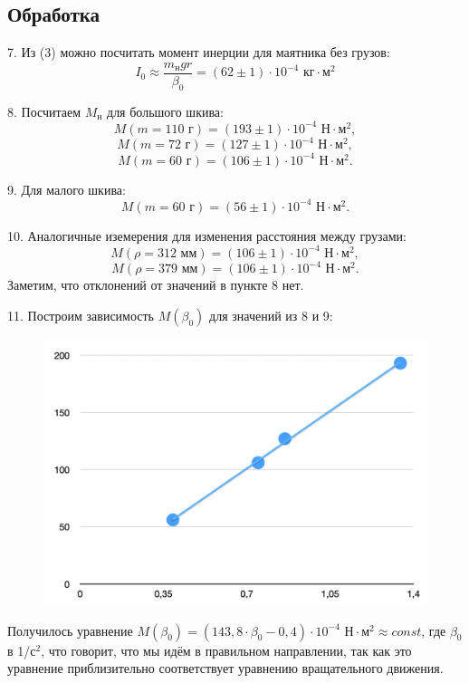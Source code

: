 \subsection{Обработка}

7. Из (3) можно посчитать момент инерции для маятника без грузов:
\begin{equation*}
    I_0 \approx \frac{m_\text{н}gr}{\beta_0} = (62 \pm 1)\cdot 10^{-4} \text{ кг} \cdot \text{м}^2
\end{equation*}

8. Посчитаем $M_\text{н}$ для большого шкива:
\[M (m = 110\text{ г})  = (193 \pm 1) \cdot 10^{-4} \text{ Н} \cdot \text{м}^2,\]
\[M (m = 72\text{ г})  = (127 \pm 1) \cdot 10^{-4} \text{ Н} \cdot \text{м}^2,\]
\[M (m = 60\text{ г})  = (106 \pm 1) \cdot 10^{-4} \text{ Н} \cdot \text{м}^2.\]

9. Для малого шкива:
\[M (m = 60\text{ г})  = (56 \pm 1) \cdot 10^{-4} \text{ Н} \cdot \text{м}^2.\]

10. Аналогичные иземерения для изменения расстояния между грузами:
\[M (\rho = 312 \text{ мм})  = (106 \pm 1) \cdot 10^{-4} \text{ Н} \cdot \text{м}^2,\]
\[M (\rho = 379 \text{ мм})  = (106 \pm 1) \cdot 10^{-4} \text{ Н} \cdot \text{м}^2.\]
Заметим, что отклонений от значений в пункте 8 нет.

11. Построим зависимость $M(\beta_0)$ для значений из 8 и 9:
\begin{figure}[H]
    \centering
\includegraphics[width=0.75\linewidth,center]{p2.png}
    \label{fig:my_label}
\end{figure}
Получилось уравнение $M (\beta_0) = (143,8 \cdot \beta_0 - 0,4) \cdot 10^{-4} \text{ Н} \cdot \text{м}^2 \approx const$, где $\beta_0$ в 1/с$^2$, что
говорит, что мы идём в правильном направлении, так как это уравнение
приблизительно соответствует уравнению вращательного движения.

